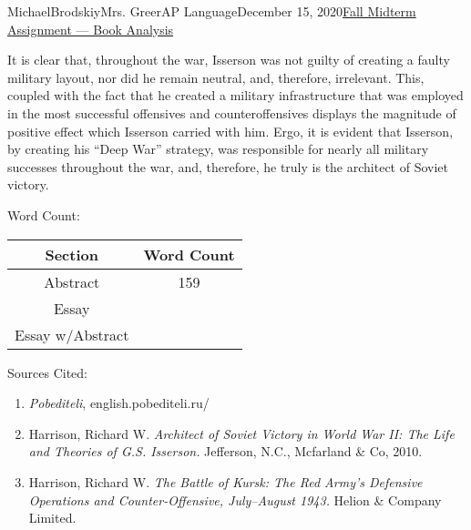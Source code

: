 \documentclass[12pt,letterpaper]{article}
\begin{document}
\begin{mla}{Michael}{Brodskiy}{Mrs. Greer}{AP Language}{December 15, 2020}{\underline{Fall Midterm Assignment — Book Analysis}}
  \begin{justify}
    \vspace{-12pt}\quad It is clear that, throughout the war, Isserson was not guilty of creating a faulty military layout, nor did he remain neutral, and, therefore, irrelevant. This, coupled with the fact that he created a military infrastructure that was employed in the most successful offensives and counteroffensives displays the magnitude of positive effect which Isserson carried with him. Ergo, it is evident that Isserson, by creating his “Deep War” strategy, was responsible for nearly all military successes throughout the war, and, therefore, he truly is the architect of Soviet victory. 
  \end{justify}

  \begin{center}
    Word Count:\\\vspace{10pt}
    \begin{tabular}{| c | c |}
      \hline
      Section & Word Count\\
      \hline
      Abstract & 159\\
      \hline
      Essay & \\
      \hline
      Essay w/Abstract & \\
     \hline
    \end{tabular}
  \end{center}

  \newpage

  \begin{center}
    Sources Cited:
  \end{center}

  \begin{enumerate}

    \item \textit{Pobediteli}, english.pobediteli.ru/

    \item Harrison, Richard W.\hspace{5pt} \textit{Architect of Soviet Victory in World War II: The Life and Theories of G.S. Isserson.} Jefferson, N.C., Mcfarland \& Co, 2010.

    \item Harrison, Richard W.\hspace{5pt} \textit{The Battle of Kursk: The Red Army's Defensive Operations and Counter-Offensive, July–August 1943.} Helion \& Company Limited.

  \end{enumerate}

\end{mla}
\end{document}
